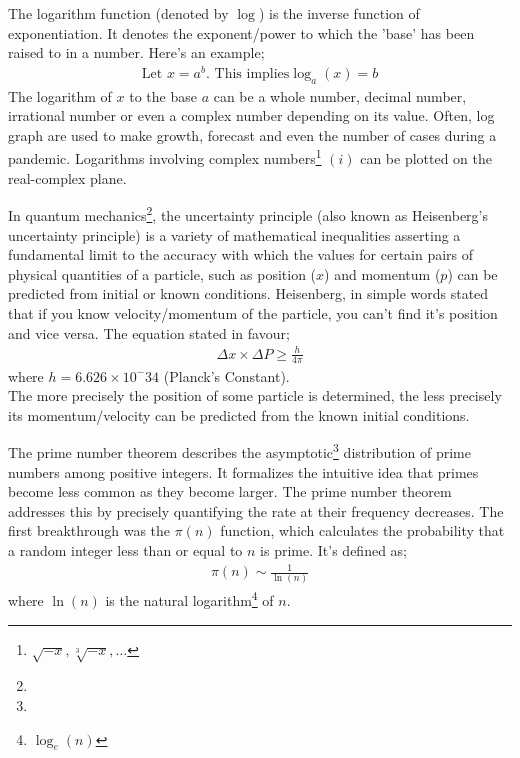 \documentclass{article}
\begin{document}
\begin{mathbox}
The {logarithm} function (denoted by $\log$) is the {inverse} function of {exponentiation}. It denotes the {exponent/power} to which the {'base'} has been raised to in a number. Here's an example;
\begin{align*}
    \text{Let } x = a^b. \text{ This implies} \log_a (x) = b
\end{align*}
The logarithm of $x$ to the base $a$ can be a {whole number, decimal number, irrational number} or even a {complex number} depending on its value. Often, log graph are used to make growth, forecast and even the number of cases during a pandemic. Logarithms involving complex numbers\footnote{\sffamily${\sqrt{-x}, \sqrt[3]{-x}, \dots}$} $(i)$ can be plotted on the real-complex plane.
\end{mathbox}
\begin{phybox}
In quantum mechanics\footnote{}, the uncertainty principle (also known as Heisenberg's uncertainty principle) is a variety of mathematical inequalities asserting a fundamental limit to the accuracy with which the values for certain pairs of physical quantities of a particle, such as position ($x$) and momentum ($p$) can be predicted from initial or known conditions. Heisenberg, in simple words stated that if you know velocity/momentum of the particle, you can't find it's position and vice versa. The equation stated in favour;
\begin{align*}
    \Delta x \times \Delta P \geq \frac{h}{4\pi}
\end{align*}
where  $h = 6.626 \times 10^-34$ (Planck's Constant).\\
The more precisely the position of some particle is determined, the less precisely its momentum/velocity can be predicted from the known initial conditions.
\end{phybox}
\begin{mathbox}
The prime number theorem describes the asymptotic\footnote[1]{} distribution of prime numbers among positive integers. It formalizes the intuitive idea that primes become less common as they become larger. The prime number theorem addresses this by precisely quantifying the rate at their frequency decreases. The first breakthrough was the $\pi(n)$ function, which calculates the probability that a random integer less than or equal to $n$ is prime. It's defined as;
\begin{align*}
    \pi(n) \sim \frac{1}{\ln(n)}
\end{align*}
where $\ln (n)$ is the natural logarithm\footnote{$\log_e(n)$} of $n$.
\end{mathbox}
\end{document}
